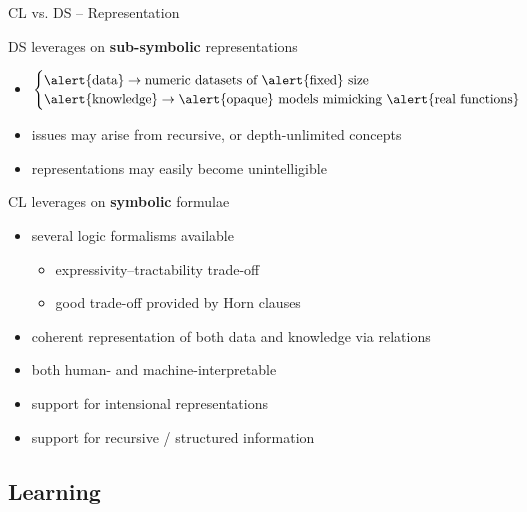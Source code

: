 \documentclass[presentation]{beamer}\mode<presentation>{\usetheme{AMSBolognaFC}}
\begin{document}
\begin{frame}[allowframebreaks]{CL vs. DS -- Representation}
    \begin{block}{DS leverages on \textbf{sub-symbolic} representations}
        \begin{itemize}
            \item $\begin{cases}
                \alert{\text{data}} \rightarrow \text{numeric datasets of \alert{fixed} size}
                \\
                \alert{\text{knowledge}} \rightarrow \text{\alert{opaque} models mimicking \alert{real functions}}
            \end{cases}$
            \item issues may arise from \alert{recursive}, or \alert{depth-unlimited} concepts
            \item representations may easily become \alert{unintelligible} 
        \end{itemize}
    \end{block}

    \begin{block}{CL leverages on \textbf{symbolic} formulae}
        \begin{itemize}
            \item several \alert{logic formalisms} available
            \begin{itemize}
                \item \alert{expressivity--tractability} trade-off
                \item good trade-off provided by \alert{Horn clauses}
            \end{itemize}
            \item coherent representation of \alert{both} data and knowledge via relations
            \item both human- and machine-\alert{interpretable}
            \item support for \alert{intensional} representations
            \item support for \alert{recursive} / structured information
            \end{itemize}
    \end{block}
\end{frame}

\subsection{Learning}
\end{document}
